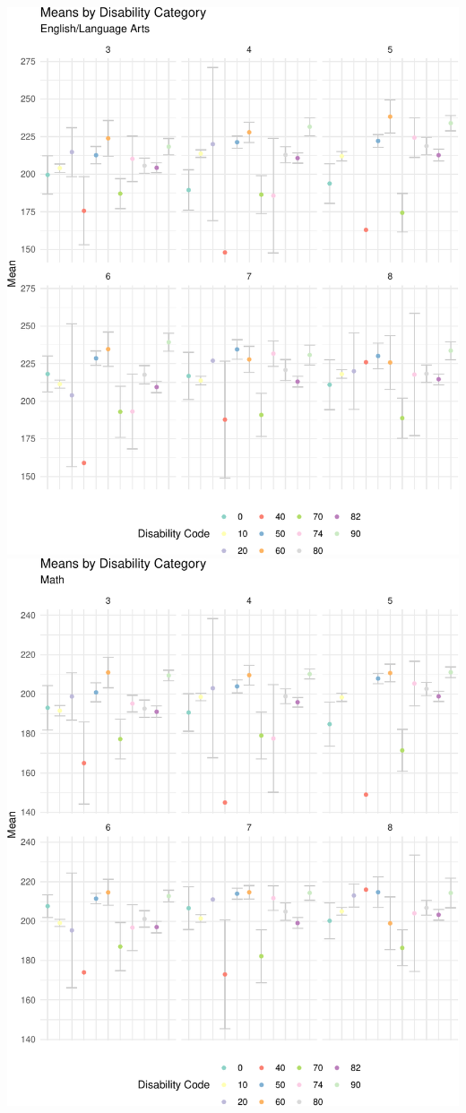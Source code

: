 \documentclass[]{article}
\begin{document}
\includegraphics{tech_report_18_files/figure-latex/plots38-1.pdf}
\includegraphics{tech_report_18_files/figure-latex/plots38-2.pdf}
\end{document}
